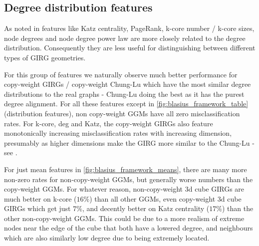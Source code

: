 \subsection{Degree distribution features}
As noted in \cite{blasius2018towards} features like Katz centrality, PageRank, k-core number / k-core sizes, node degrees and node degree power law are more closely related to the degree distribution. Consequently they are less useful for distinguishing between different types of GIRG geometries.

For this group of features we naturally observe much better performance for copy-weight GIRGs / copy-weight Chung-Lu which have the most similar degree distributions to the real graphs - Chung-Lu doing the best as it has the purest degree alignment. For all these features  except  in \cref{fig:blasius_framework_table} (distribution features), non copy-weight GGMs have all zero misclassification rates. For k-core, deg and Katz, the copy-weight GIRGs also feature monotonically increasing misclassification rates with increasing dimension, presumably as higher dimensions make the GIRG more similar to the Chung-Lu - see \cite{friedrich2023cliques}.

For just mean features in \cref{fig:blasius_framework_means}, there are many more non-zero rates for non-copy-weight GGMs, but generally worse numbers than the copy-weight GGMs. For whatever reason, non-copy-weight 3d cube GIRGs are much better on k-core ($16\%$) than all other GGMs, even copy-weight 3d cube GIRGs which get just $7\%$, and decently better on Katz centrality ($17\%$) than the other non-copy-weight GGMs.
This could be due to a more realism of extreme nodes near the edge of the cube that both have a lowered degree, and neighbours which are also similarly low degree due to being extremely located.



